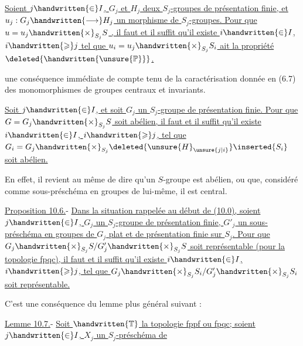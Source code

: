



 \uline{Soient $j\handwritten{\in}I$, $G_j$ et $H_j$ deux $S_j$-groupes de présentation finie, et $u_j:G_j\handwritten{\longrightarrow}H_j$ un morphisme de $S_j$-groupes. Pour que $u=u_j\handwritten{\times}_{S_j}S$ , il faut et il suffit qu'il existe $i\handwritten{\in}I$, $i\handwritten{\geqslant}j$ tel que $u_i=u_j\handwritten{\times}_{S_j}S_i$ ait la propriété $\deleted{\handwritten{\unsure{\mathbb{P}}}}$.}

 une conséquence immédiate de  compte tenu de la caractérisation donnée en (6.7) des monomorphismes de groupes centraux et invariants.

  \uline{Soit $j\handwritten{\in}I$, et soit $G_j$ un $S_j$-groupe de présentation finie. Pour que $G=G_j\handwritten{\times}_{S_j}S$ soit abélien, il faut et il suffit qu'il existe $i\handwritten{\in}I$, $i\handwritten{\geqslant}j$, tel que $G_i=G_j\handwritten{\times}_{S_j}\deleted{\unsure{H}_{\unsure{j|i}}}\inserted{S_i}$ soit abélien.}

En effet, il revient au même de dire qu'un $S$-groupe est abélien, ou que, considéré comme sous-préschéma en groupes de lui-même, il est central.

\uline{Proposition 10.6.}- \uline{Dans la situation rappelée au début de (10.0), soient $j\handwritten{\in}I$, $G_j$ un $S_j$-groupe de présentation finie, $G'_j$ un sous-préschéma en groupes de $G_j$ plat et de présentation finie sur $S_j$. Pour que $G_j\handwritten{\times}_{S_j}S/G'_j\handwritten{\times}_{S_j}S$ soit représentable (pour la topologie fpqc), il faut et il suffit qu'il existe $i\handwritten{\in}I$, $i\handwritten{\geqslant}j$, tel que $G_j\handwritten{\times}_{S_j}S_i/G'_j\handwritten{\times}_{S_j}S_i$ soit représentable.}

C'est une conséquence du lemme plus général suivant :

\uline{Lemme 10.7.}- \uline{Soit $\handwritten{\mathbb{T}}$ la topologie fppf ou fpqc; soient $j\handwritten{\in}I$, $X_j$ un $S_j$-préschéma de}
